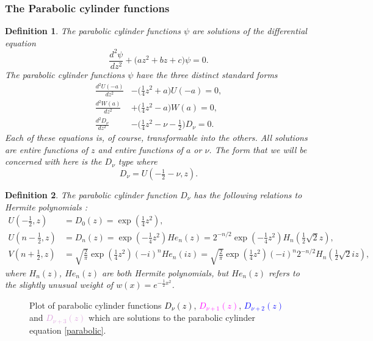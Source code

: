 \documentclass[12pt]{article}
\newtheorem{mydef1}{Definition}[section]
\numberwithin{figure}{section}
\numberwithin{equation}{section}
\numberwithin{table}{section}
\begin{document}
\subsubsection{The Parabolic cylinder functions}
\begin{mydef1}
The parabolic cylinder functions $\psi$ are solutions of the differential equation
\begin{equation}
\frac{d^2\psi}{dz^2}+\bigg(az^2+bz+c\bigg)\psi=0.\label{parabolic}
\end{equation}
The parabolic cylinder functions $\psi$ have the three distinct standard forms \cite[\S12.2(i)]{DLMF}
\begin{subequations}
\begin{align}
\frac{d^2U(-a)}{dz^2}&-\big(\tfrac{1}{4}z^2+a\big)U(-a)=0,\\
\frac{d^2W(a)}{dz^2}&+\big(\tfrac{1}{4}z^2-a\big)W(a)=0,\\
\frac{d^2D_\nu}{dz^2}&-\big(\tfrac{1}{4}z^2-\nu-\tfrac{1}{2}\big)D_\nu=0.
\end{align}
\end{subequations}
Each of these equations is, of course, transformable into the others. All solutions are entire functions of $z$ and entire functions of $a$ or $\nu$. The form that we will be concerned with here is the $D_\nu$ type where
$$D_\nu=U(-\tfrac{1}{2}-\nu,z).$$
\end{mydef1}
\begin{mydef1}
The parabolic cylinder function $D_\nu$ has the following relations to Hermite polynomials \cite[\S12.7(i)]{DLMF}:
\begin{subequations}
\begin{align}\label{PCF1}
U(-\tfrac{1}{2},z)&=D_0(z)=\exp({\tfrac{1}{4}z^2}),\\\label{PCF2}
U(n-\tfrac{1}{2},z)&=D_n(z)=\exp(-\tfrac{1}{4}z^2)He_n(z)=2^{-n/2}\exp(-\tfrac{1}{4}z^2)H_n(\tfrac{1}{2}\sqrt{2}z),\\\label{PCF3}
V(n+\tfrac{1}{2},z)&=\sqrt{\tfrac{2}{\pi}}\exp(\tfrac{1}{4}z^2)(-i)^nHe_n(iz)=\sqrt{\tfrac{2}{\pi}}\exp(\tfrac{1}{4}z^2)(-i)^n2^{-n/2}H_n(\tfrac{1}{2}\sqrt{2}iz),
\end{align}
\end{subequations}
where $H_n(z)$, $He_n(z)$ are both Hermite polynomials, but $He_n(z)$ refers to the slightly unusual weight of $w(x)=e^{-\tfrac{1}{2}x^2}$.
\end{mydef1}
\begin{figure}[H]
\centering
{}
\caption{Plot of parabolic cylinder functions \textcolor{black}{$D_\nu(z)$}, \textcolor{magenta}{$D_{\nu+1}(z)$}, \textcolor{blue}{$D_{\nu+2}(z)$} and \textcolor{Plum}{$D_{\nu+3}(z)$} which are solutions to the parabolic cylinder equation \eqref{parabolic}.}
\end{figure}
\end{document}
